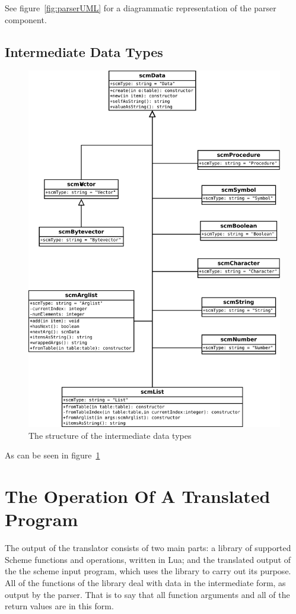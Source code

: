 See figure~\ref{fig:parserUML} for a diagrammatic representation of the parser
component.

\subsection{Intermediate Data Types}

\begin{figure}
\centering
\includegraphics[width=\textwidth]{scmDataUML.pdf}
\caption{The structure of the intermediate data types}
\label{fig:scmDataUML}
\end{figure}

As can be seen in figure~\ref{fig:scmDataUML}


\section{The Operation Of A Translated Program}

The output of the translator consists of two main parts: a library of supported
Scheme functions and operations, written in Lua; and the translated output of
the the scheme input program, which uses the library to carry out its purpose.
All of the functions of the library deal with data in the intermediate form, as
output by the parser. That is to say that all function arguments and all of the
return values are in this form.
